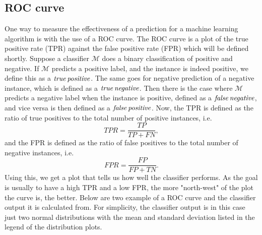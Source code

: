 \subsection*{ROC curve}
One way to measure the effectiveness of a prediction for a machine learning algorithm is with the use of a ROC curve. 
The ROC curve is a plot of the true positive rate (TPR) against the false positive rate (FPR) which will be defined shortly. 
Suppose a classifier $\mathcal{M}$ does a binary classification of positive and negative. If $\mathcal{M}$ predicts a positive 
label, and the instance is indeed positive, we define this as a $\it{true\, positive}$. The same goes for negative prediction of a 
negative instance, which is defined as a $\it{true\, negative}$. Then there is the case where $\mathcal{M}$ predicts a negative label
when the instance is positive, defined as a $\it{false\, negative}$, and vice versa is then defined as a $\it{false\, positive}$\cite{FAWCETT2006861}.
Now, the TPR is defined as the ratio of true positives to the total number of positive instances, i.e. 
\begin{equation*}
    TPR = \frac{TP}{TP+FN},
\end{equation*}
and the FPR is defined as the ratio of false positives to the total number of negative instances, i.e.
\begin{equation*}
    FPR = \frac{FP}{FP+TN}.
\end{equation*}
Using this, we get a plot that tells us how well the classifier performs. As the goal is usually to have a high TPR and a low FPR,
the more "north-west"\cite{FAWCETT2006861} of the plot the curve is, the better. Below are two example of a ROC curve and the classifier output it 
is calculated from. For simplicity, the classifier output is in this case just two normal distributions with the mean and standard deviation 
listed in the legend of the distribution plots.
